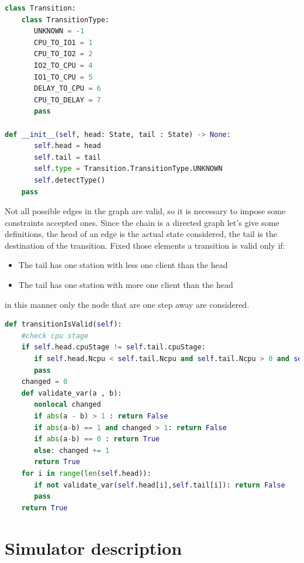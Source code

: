 \documentclass[12pt,a4paper]{article}
\begin{document}
\begin{lstlisting}[language=python]
class Transition:   
    class TransitionType:
       UNKNOWN = -1
       CPU_TO_IO1 = 1
       CPU_TO_IO2 = 2
       IO2_TO_CPU = 4
       IO1_TO_CPU = 5
       DELAY_TO_CPU = 6
       CPU_TO_DELAY = 7
       pass

def __init__(self, head: State, tail : State) -> None:
       self.head = head
       self.tail = tail
       self.type = Transition.TransitionType.UNKNOWN
       self.detectType()
    pass
\end{lstlisting}

Not all possible edges in the graph are valid, so it is necessary to impose some constraints accepted ones. Since the chain is a directed graph let's give some definitions, the head of an edge is the actual state considered, the tail is the destination of the transition. Fixed those elements a transition is valid only if:
\begin{itemize}
    \item The tail has one station with less one client than the head 
    \item The tail has one station with more one client than the head 
\end{itemize}
in this manner only the node that are one step away are considered. 

\begin{lstlisting}[language=python,breaklines]
def transitionIsValid(self):
    #check cpu stage
    if self.head.cpuStage != self.tail.cpuStage:
       if self.head.Ncpu < self.tail.Ncpu and self.tail.Ncpu > 0 and self.head.Ncpu > 0: return False
       pass
    changed = 0
    def validate_var(a , b):
       nonlocal changed 
       if abs(a - b) > 1 : return False 
       if abs(a-b) == 1 and changed > 1: return False
       if abs(a-b) == 0 : return True
       else: changed += 1         
       return True
    for i in range(len(self.head)):
       if not validate_var(self.head[i],self.tail[i]): return False
       pass
    return True
\end{lstlisting}


\section{Simulator description}
\end{document}
